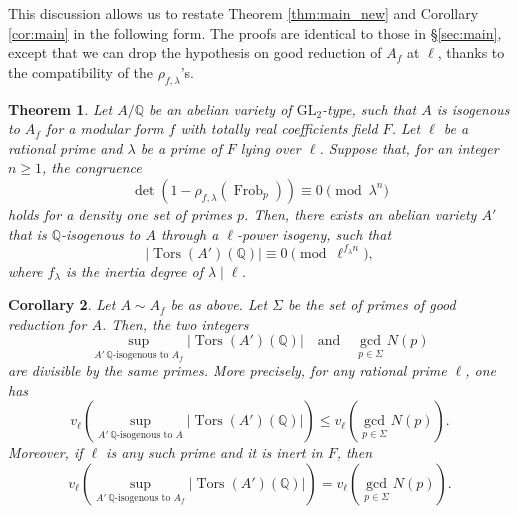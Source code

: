 \documentclass[a4paper,11pt]{amsart}
\newtheorem{theorem}{Theorem}[section]
\newtheorem{corollary}[theorem]{Corollary}
\theoremstyle{definition}
\newcommand{\Q}{\mathbb Q}
\newcommand{\GL}{\text{GL}}
\DeclareMathOperator{\Frob}{Frob}
\DeclareMathOperator{\Tors}{Tors}
\begin{document}
This discussion allows us to restate Theorem \ref{thm:main_new} and Corollary \ref{cor:main} in the following form. The proofs are identical to those in \S \ref{sec:main}, except that we can drop the hypothesis on good reduction of \(A_f\) at \(\ell\), thanks to the compatibility of the \(\rho_{f,\lambda}\)'s.

\begin{theorem}\label{thm_mainQ}
    Let \(A/\Q\) be an abelian variety of \(\GL_2\)-type, such that \(A\) is isogenous to \(A_f\) for a modular form \(f\) with totally real coefficients field \(F\). Let \(\ell\) be a rational prime and \(\lambda\) be a prime of \(F\) lying over \(\ell\). Suppose that, for an integer \(n \ge 1\), the congruence
    \[
    \det(1-\rho_{f,\lambda}(\Frob_p)) \equiv 0 \pmod{\lambda^n}
    \]
    holds for a density one set of primes \(p\). Then, there exists an abelian variety \(A'\) that is \(\Q\)-isogenous to \(A\) through a \(\ell\)-power isogeny, such that
    \[
    |\Tors(A')(\Q)| \equiv 0 \pmod{\ell^{f_\lambda n}},
    \]
    where \(f_{\lambda}\) is the inertia degree of \(\lambda \mid \ell\).
\end{theorem}
\begin{corollary}\label{cor:mainQ}
    Let \(A\sim A_f\) be as above. Let \(\Sigma\) be the set of primes of good reduction for \(A\). Then, the two integers
    \[
    \sup_{A'\, \Q\text{-isogenous to }A_f} |\Tors(A')(\Q)|\quad \text{and} \quad \gcd_{p \in \Sigma} N(p)
    \]
    are divisible by the same primes. More precisely, for any rational prime \(\ell\), one has
    \[
    v_\ell\left(\sup_{A'\, \Q\text{-isogenous to }A} |\Tors(A')(\Q)|\right)\le v_\ell\left(\gcd_{p \in \Sigma} N(p)\right).
    \]
    Moreover, if \(\ell\) is any such prime and it is inert in \(F\), then
    \[
    v_\ell\left(\sup_{A'\, \Q\text{-isogenous to }A_f} |\Tors(A')(\Q)|\right)=v_\ell\left(\gcd_{p \in \Sigma} N(p)\right).
    \]
\end{corollary}
\end{document}
